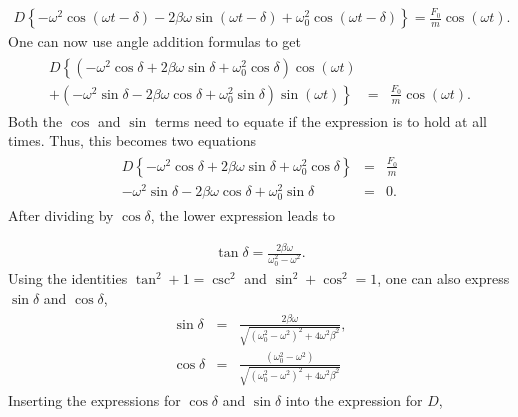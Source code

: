 \documentclass[letterpaper,10pt,english]{sphinxmanual}
\begin{document}
\begin{equation*}
\begin{split}
\begin{equation}
D\left\{-\omega^2\cos(\omega t-\delta)-2\beta\omega\sin(\omega t-\delta)+\omega_0^2\cos(\omega t-\delta)\right\}=\frac{F_0}{m}\cos(\omega t).
\label{_auto45} \tag{60}
\end{equation}
\end{split}
\end{equation*}
One can now use angle addition formulas to get
\begin{equation*}
\begin{split}
\begin{eqnarray}
D\left\{(-\omega^2\cos\delta+2\beta\omega\sin\delta+\omega_0^2\cos\delta)\cos(\omega t)\right.&&\\
\nonumber
\left.+(-\omega^2\sin\delta-2\beta\omega\cos\delta+\omega_0^2\sin\delta)\sin(\omega t)\right\}
&=&\frac{F_0}{m}\cos(\omega t).
\end{eqnarray}
\end{split}
\end{equation*}
Both the \(\cos\) and \(\sin\) terms need to equate if the expression is to hold at all times. Thus, this becomes two equations
\begin{equation*}
\begin{split}
\begin{eqnarray}
D\left\{-\omega^2\cos\delta+2\beta\omega\sin\delta+\omega_0^2\cos\delta\right\}&=&\frac{F_0}{m}\\
\nonumber
-\omega^2\sin\delta-2\beta\omega\cos\delta+\omega_0^2\sin\delta&=&0.
\end{eqnarray}
\end{split}
\end{equation*}
After dividing by \(\cos\delta\), the lower expression leads to




\begin{equation*}
\begin{split}
\begin{equation}
\tan\delta=\frac{2\beta\omega}{\omega_0^2-\omega^2}.
\label{_auto46} \tag{61}
\end{equation}
\end{split}
\end{equation*}
Using the identities \(\tan^2+1=\csc^2\) and \(\sin^2+\cos^2=1\), one can also express \(\sin\delta\) and \(\cos\delta\),
\begin{equation*}
\begin{split}
\begin{eqnarray}
\sin\delta&=&\frac{2\beta\omega}{\sqrt{(\omega_0^2-\omega^2)^2+4\omega^2\beta^2}},\\
\nonumber
\cos\delta&=&\frac{(\omega_0^2-\omega^2)}{\sqrt{(\omega_0^2-\omega^2)^2+4\omega^2\beta^2}}
\end{eqnarray}
\end{split}
\end{equation*}
Inserting the expressions for \(\cos\delta\) and \(\sin\delta\) into the expression for \(D\),
\end{document}
